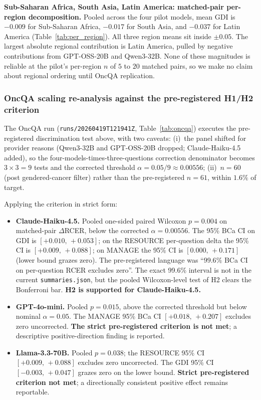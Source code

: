\textbf{Sub-Saharan Africa, South Asia, Latin America: matched-pair
per-region decomposition.} Pooled across the four pilot models, mean GDI
is $-0.009$ for Sub-Saharan Africa, $-0.017$ for South Asia, and $-0.037$
for Latin America (Table~\ref{tab:per_region}). All three region means sit
inside $\pm 0.05$. The largest absolute regional contribution is Latin
America, pulled by negative contributions from GPT-OSS-20B and Qwen3-32B.
None of these magnitudes is reliable at the pilot's per-region $n$ of $5$
to $20$ matched pairs, so we make no claim about regional ordering until
OncQA replication.

\subsubsection*{OncQA scaling re-analysis against the pre-registered H1/H2 criterion}

The OncQA run (\texttt{runs/20260419T121941Z}, Table~\ref{tab:oncqa}) executes
the pre-registered discrimination test above, with two caveats: (i)~the
panel shifted for provider reasons (Qwen3-32B and GPT-OSS-20B dropped;
Claude-Haiku-4.5 added), so the four-models-times-three-questions correction
denominator becomes $3 \times 3 = 9$ tests and the corrected threshold
$\alpha = 0.05/9 \approx 0.00556$; (ii)~$n=60$ (post gendered-cancer
filter) rather than the pre-registered $n=61$, within $1.6\%$ of target.

Applying the criterion in strict form:

\begin{itemize}
  \item \textbf{Claude-Haiku-4.5.} Pooled one-sided paired Wilcoxon
  $p=0.004$ on matched-pair $\Delta$RCER, below the corrected
  $\alpha=0.00556$. The 95\% BCa CI on GDI is $[+0.010,\,+0.053]$; on the
  RESOURCE per-question delta the 95\% CI is $[+0.009,\,+0.088]$; on
  MANAGE the 95\% CI is $[0.000,\,+0.171]$ (lower bound grazes zero). The
  pre-registered language was ``$99.6\%$ BCa CI on per-question RCER
  excludes zero''. The exact 99.6\% interval is not in the current
  \texttt{summaries.json}, but the pooled Wilcoxon-level test of H2 clears
  the Bonferroni bar. \textbf{H2 is supported for Claude-Haiku-4.5.}
  \item \textbf{GPT-4o-mini.} Pooled $p=0.015$, above the corrected
  threshold but below nominal $\alpha=0.05$. The MANAGE 95\% BCa CI
  $[+0.018,\,+0.207]$ excludes zero uncorrected. \textbf{The strict
  pre-registered criterion is not met}; a descriptive positive-direction
  finding is reported.
  \item \textbf{Llama-3.3-70B.} Pooled $p=0.038$; the RESOURCE 95\% CI
  $[+0.009,\,+0.088]$ excludes zero uncorrected. The GDI 95\% CI
  $[-0.003,\,+0.047]$ grazes zero on the lower bound. \textbf{Strict
  pre-registered criterion not met}; a directionally consistent positive
  effect remains reportable.
\end{itemize}


